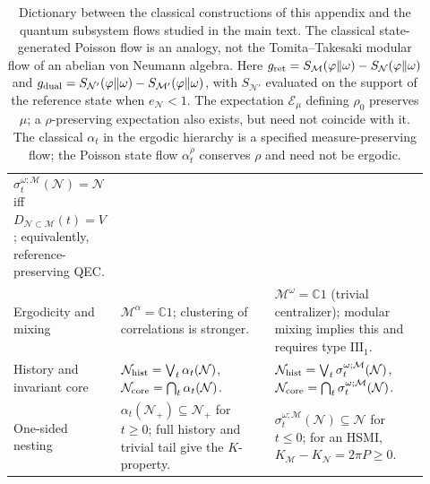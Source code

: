 \documentclass[a4paper,11pt]{article}
\theoremstyle{definition}
\newcommand{\mN}{\mathcal{N}}
\newcommand{\mM}{\mathcal{M}}
\newcommand{\mE}{\mathcal{E}}
\begin{document}
\begin{table}[htbp]
\begin{tabular}{@{}>{\raggedright\arraybackslash}p{0.19\linewidth}
                >{\raggedright\arraybackslash}p{0.365\linewidth}
                >{\raggedright\arraybackslash}p{0.365\linewidth}@{}}
$\sigma_t^{\omega;\mM}(\mN)=\mN$ iff
$D_{\mN\subset\mM}(t)=V$; equivalently, reference-preserving QEC. \\
\addlinespace[2pt]
Ergodicity and mixing &
$\mM^\alpha=\mathbb C1$;
clustering of correlations is stronger. &
$\mM^\omega=\mathbb C1$ (trivial centralizer);
modular mixing implies this and requires type $\mathrm{III}_1$. \\
\addlinespace[2pt]
History and invariant core &
$\mN_{\rm hist}=\bigvee_t\alpha_t(\mN)$,
$\mN_{\rm core}=\bigcap_t\alpha_t(\mN)$. &
$\mN_{\rm hist}=\bigvee_t\sigma_t^{\omega;\mM}(\mN)$,
$\mN_{\rm core}=\bigcap_t\sigma_t^{\omega;\mM}(\mN)$. \\
\addlinespace[2pt]
One-sided nesting &
$\alpha_t(\mN_+)\subseteq\mN_+$ for $t\ge0$;
full history and trivial tail give the $K$-property. &
$\sigma_t^{\omega;\mM}(\mN)\subseteq\mN$ for $t\le0$;
for an HSMI, $K_{\mM}-K_{\mN}=2\pi P\ge0$. \\
\bottomrule
\end{tabular}
\endgroup
\vspace{0.3em}

\caption{Dictionary between the classical constructions of this appendix and the
quantum subsystem flows studied in the main text. The classical state-generated
Poisson flow is an analogy, not the Tomita--Takesaki modular flow of an
abelian von Neumann algebra. Here $g_{\rm ret}=S_{\mM}(\varphi\|\omega)-S_{\mN}(\varphi\|\omega)$ and
$g_{\rm dual}=S_{\mN'}(\varphi\|\omega)-S_{\mM'}(\varphi\|\omega)$, with
$S_{\mN'}$ evaluated on the support of the reference state when $e_{\mN}<1$.
The expectation $\mE_\mu$ defining $\rho_0$ preserves $\mu$; a
$\rho$-preserving expectation also exists, but need not coincide with it.
The classical $\alpha_t$ in the ergodic hierarchy is a specified
measure-preserving flow; the Poisson state flow $\alpha_t^\rho$ conserves
$\rho$ and need not be ergodic.}
\end{table}
\end{document}
